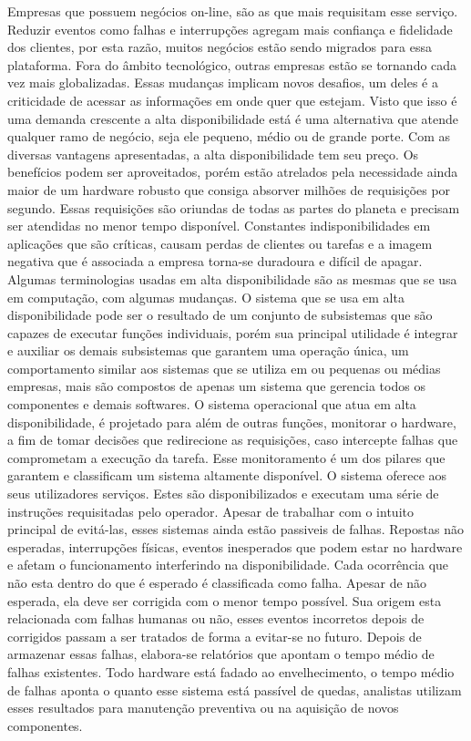 Empresas que possuem negócios on-line, são as que mais requisitam esse serviço. Reduzir eventos como falhas e interrupções agregam mais confiança e fidelidade dos clientes, por esta razão, muitos negócios estão sendo migrados para essa plataforma. Fora do âmbito tecnológico, outras empresas estão se tornando cada vez mais globalizadas. Essas mudanças implicam novos desafios, um deles é a criticidade de acessar as informações em onde quer que estejam. Visto que isso é uma demanda crescente a alta disponibilidade está é uma alternativa que atende qualquer ramo de negócio, seja ele pequeno, médio ou de grande porte.
Com as diversas vantagens apresentadas, a alta disponibilidade tem seu preço. Os benefícios podem ser aproveitados, porém estão atrelados pela necessidade ainda maior de um hardware robusto que consiga absorver milhões de requisições por segundo. Essas requisições são oriundas de todas as partes do planeta e precisam ser atendidas no menor tempo disponível. Constantes indisponibilidades em aplicações que são críticas, causam perdas de clientes ou tarefas e a imagem negativa que é associada a empresa torna-se duradoura e difícil de apagar.
Algumas terminologias usadas em alta disponibilidade são as mesmas que se usa em computação, com algumas mudanças. O sistema que se usa em alta disponibilidade pode ser o resultado de um conjunto de subsistemas que são capazes de executar funções individuais, porém sua principal utilidade é integrar e auxiliar os demais subsistemas que garantem uma operação única, um comportamento similar aos sistemas que se utiliza em ou pequenas ou médias empresas, mais são compostos de apenas um sistema que gerencia todos os componentes e demais softwares.
O sistema operacional que atua em alta disponibilidade, é projetado para além de outras funções, monitorar o hardware, a fim de tomar decisões que redirecione as requisições, caso intercepte falhas que comprometam a execução da tarefa. Esse monitoramento é um dos pilares que garantem e classificam um sistema altamente disponível.
O sistema oferece aos seus utilizadores serviços. Estes são disponibilizados e executam uma série de instruções requisitadas pelo operador.
Apesar de trabalhar com o intuito principal de evitá-las, esses sistemas ainda estão passiveis de falhas. Repostas não esperadas, interrupções físicas, eventos inesperados que podem estar no hardware e afetam o funcionamento interferindo na disponibilidade. Cada ocorrência que não esta dentro do que é esperado é classificada como falha. Apesar de não esperada, ela deve ser corrigida com o menor tempo possível. Sua origem esta relacionada com falhas humanas ou não, esses eventos incorretos depois de corrigidos passam a ser tratados de forma a evitar-se no futuro. Depois de armazenar essas falhas, elabora-se relatórios que apontam o tempo médio de falhas existentes. Todo hardware está fadado ao envelhecimento, o tempo médio de falhas aponta o quanto esse sistema está passível de quedas, analistas utilizam esses resultados para manutenção preventiva ou na aquisição de novos componentes.
